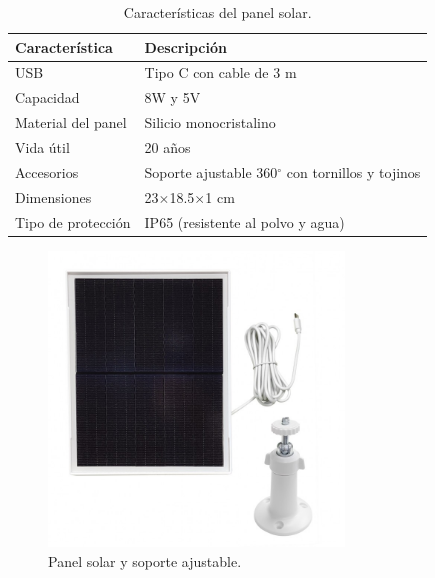 \begin{table}[htbp]
\begin{center}
\caption{Características del panel solar.}
\begin{tabular}{|l|l|} %
\hline
\rowcolor[HTML]{C0C0C0} 
\textbf{Característica} & \textbf{Descripción}\\ \hline
USB & Tipo C con cable de 3 m \\ \hline
Capacidad & 8W y 5V \\ \hline
Material del panel & Silicio monocristalino \\ \hline
Vida útil & 20 años \\ \hline
Accesorios & Soporte ajustable 360$^\circ$ con tornillos y tojinos \\ \hline
Dimensiones & 23$\times$18.5$\times$1 cm\\ \hline
Tipo de protección & IP65 (resistente al polvo y agua)\\ \hline
\end{tabular}
\end{center}
\end{table}

\begin{figure}[h]
    \centering
    \includegraphics[width=0.7\textwidth]{img/herramientas/panel_solar.png}
    \caption{Panel solar y soporte ajustable.} \label{Img:PanelSolar}
\end{figure}

